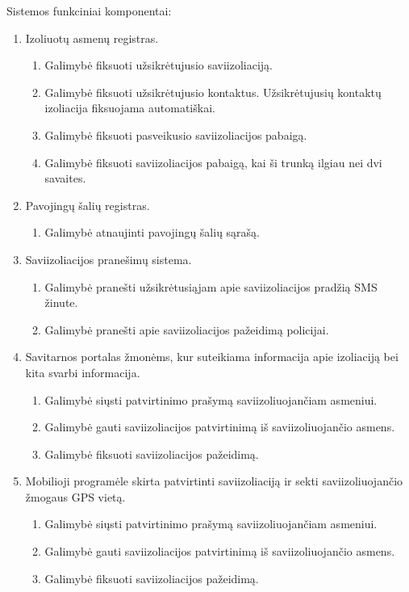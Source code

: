 \documentclass{VUMIFPSkursinis}
\begin{document}
Sistemos funkciniai komponentai:
\begin{enumerate}
	\item Izoliuotų asmenų registras.
	\begin{enumerate}
		\item Galimybė fiksuoti užsikrėtujusio saviizoliaciją.
		\item Galimybė fiksuoti užsikrėtujusio kontaktus. Užsikrėtujusių kontaktų izoliacija fiksuojama automatiškai.
		\item Galimybė fiksuoti pasveikusio saviizoliacijos pabaigą.
		\item Galimybė fiksuoti saviizoliacijos pabaigą, kai ši trunką ilgiau nei dvi savaites.
	\end{enumerate}

	\item Pavojingų šalių registras.
	\begin{enumerate}
		\item Galimybė atnaujinti pavojingų šalių sąrašą.
	\end{enumerate}

	\item Saviizoliacijos pranešimų sistema.
	\begin{enumerate}
		\item Galimybė pranešti užsikrėtusiąjam apie saviizoliacijos pradžią SMS žinute.
 		\item Galimybė pranešti apie saviizoliacijos pažeidimą policijai.
	\end{enumerate}

	\item Savitarnos portalas žmonėms, kur suteikiama informacija apie izoliaciją bei kita svarbi informacija.
	\begin{enumerate}
		\item Galimybė siųsti patvirtinimo prašymą saviizoliuojančiam asmeniui.
		\item Galimybė gauti saviizoliacijos patvirtinimą iš saviizoliuojančio asmens.
		\item Galimybė fiksuoti saviizoliacijos pažeidimą.
	\end{enumerate} 

	\item Mobilioji programėle skirta patvirtinti saviizoliaciją ir sekti saviizoliuojančio žmogaus GPS vietą.
	\begin{enumerate}
		\item Galimybė siųsti patvirtinimo prašymą saviizoliuojančiam asmeniui.
		\item Galimybė gauti saviizoliacijos patvirtinimą iš saviizoliuojančio asmens.
		\item Galimybė fiksuoti saviizoliacijos pažeidimą.
	\end{enumerate} 

\end{enumerate}
\end{document}
